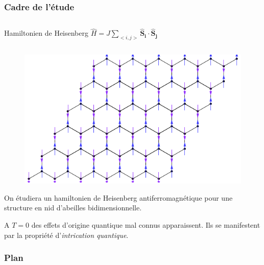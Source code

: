 \documentclass[xcolor=dvipsnames]{beamer}
\newcommand{\h}{\ensuremath{\hat{H}}\xspace}
\newcommand{\1}{\ensuremath{\ket{\om_1\bom_1}}\xspace}
\newcommand{\2}{\ensuremath{\ket{\om_2\bom_2}}\xspace}
\begin{document}
\begin{frame}
\frametitle{Cadre de l'étude}

\begin{columns}
\begin{column}{10cm}
\begin{block}{Hamiltonien de Heisenberg}
\centering
$\h = J\sum_{<i,j>}\mathbf{\hat S_i}\cdot\mathbf{\hat S_j}$
\end{block}
\end{column}
\end{columns}

\begin{figure}[htp]
	\centering
	\includegraphics[scale=0.60]{vector_img/spins_struc_nid_abeilles.pdf}
\end{figure}
On étudiera un hamiltonien de Heisenberg antiferromagnétique pour une structure en nid d'abeilles bidimensionnelle.

A $T=0$ des effets d'origine quantique mal connus apparaissent. Ils se manifestent par la propriété d'\emph{intrication quantique}.
\end{frame}

\begin{frame}
\frametitle{Plan}
\tableofcontents
\end{frame}
\end{document}
